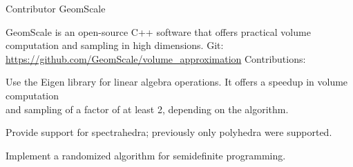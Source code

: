 

\begin{cventries}



  \cventry
    {Contributor} %
    {GeomScale} %
    {} %
    {} %
    {
    	GeomScale is an open-source C++ software that offers practical volume computation and sampling in high dimensions.
    	\newline
    	Git: \url{https://github.com/GeomScale/volume_approximation}
    	\newline
    	\medskip
    	Contributions:
    	\bigskip
      \begin{cvitems} %
		\item {Use the Eigen library for linear algebra operations. It offers a speedup in volume computation\\ 
				and sampling of a factor of at least 2, depending on the algorithm}.
        \item {Provide support for spectrahedra; previously only polyhedra were supported.}
        \item {Implement a randomized algorithm for semidefinite programming.}
      \end{cvitems}
    }


\end{cventries}
